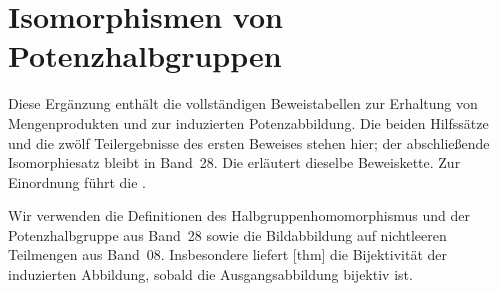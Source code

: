 \section*{Isomorphismen von Potenzhalbgruppen}
\hypertarget{power-isomorphisms.proofs}{}
Diese Ergänzung enthält die vollständigen Beweistabellen zur Erhaltung
von Mengenprodukten und zur induzierten Potenzabbildung. Die beiden
Hilfssätze und die zwölf Teilergebnisse des ersten Beweises stehen hier;
der abschließende Isomorphiesatz bleibt in Band~28.
Die \PowerIsoReadingLink{} erläutert dieselbe Beweiskette.
Zur Einordnung führt die \PowerIsoMainLink{}.

Wir verwenden die Definitionen des Halbgruppenhomomorphismus und der
Potenzhalbgruppe aus Band~28 sowie die Bildabbildung auf nichtleeren
Teilmengen aus Band~08. Insbesondere liefert
[thm] die Bijektivität der
induzierten Abbildung, sobald die Ausgangsabbildung bijektiv ist.


\par{}
\makeatletter\global{}\relax\makeatother
\hypertarget{power-isomorphisms.statement.SemigroupHomPreservesPowerProduct}{}
\PowerIsoProductStatement

